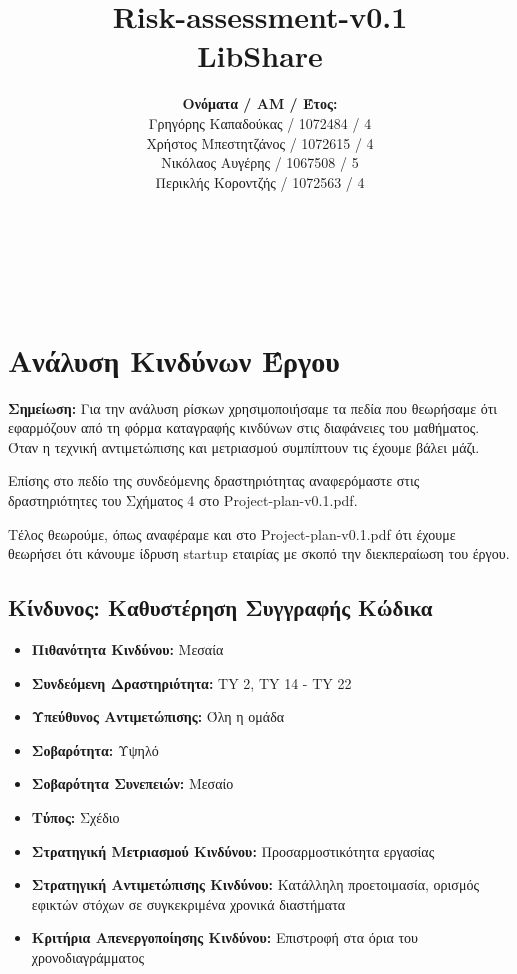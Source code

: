 \documentclass[12pt,a4paper]{article}
\title{Risk-assessment-v0.1\\ LibShare}
\author{\textbf{Ονόματα / ΑΜ / Έτος:} \\ Γρηγόρης Καπαδούκας / 1072484 / 4\textdegree \\ Χρήστος Μπεστητζάνος / 1072615 / 4\textdegree \\ Νικόλαος Αυγέρης / 1067508 / 5\textdegree \\ Περικλής Κοροντζής / 1072563 / 4\textdegree}
\begin{document}
\makeatletter
\begin{center}
	\LARGE{\@title} \\
	\pagebreak
\end{center}
\begin{LARGE}\@author\end{LARGE} \\
\pagebreak

\section{Ανάλυση Κινδύνων Έργου}

\textbf{Σημείωση:} Για την ανάλυση ρίσκων χρησιμοποιήσαμε τα πεδία που θεωρήσαμε ότι εφαρμόζουν από τη φόρμα καταγραφής κινδύνων στις διαφάνειες του μαθήματος. Όταν η τεχνική αντιμετώπισης και μετριασμού συμπίπτουν τις έχουμε βάλει μάζι.

Επίσης στο πεδίο της συνδεόμενης δραστηριότητας αναφερόμαστε στις δραστηριότητες του Σχήματος 4 στο Project-plan-v0.1.pdf.

Τέλος θεωρούμε, όπως αναφέραμε και στο Project-plan-v0.1.pdf ότι έχουμε θεωρήσει ότι κάνουμε ίδρυση startup εταιρίας με σκοπό την διεκπεραίωση του έργου.

\subsection{Κίνδυνος: Καθυστέρηση Συγγραφής Κώδικα}
\begin{itemize}
	\item \textbf{Πιθανότητα Κινδύνου:} Μεσαία
	\item \textbf{Συνδεόμενη Δραστηριότητα:} TY 2, TY 14 - TY 22
	\item \textbf{Υπεύθυνος Αντιμετώπισης:} Όλη η ομάδα
	\item \textbf{Σοβαρότητα:} Υψηλό
	\item \textbf{Σοβαρότητα Συνεπειών:} Μεσαίο
	\item \textbf{Τύπος:} Σχέδιο
	\item \textbf{Στρατηγική Μετριασμού Κινδύνου:} Προσαρμοστικότητα εργασίας
	\item \textbf{Στρατηγική Αντιμετώπισης Κινδύνου:} Κατάλληλη προετοιμασία, ορισμός εφικτών στόχων σε συγκεκριμένα χρονικά διαστήματα
	\item \textbf{Κριτήρια Απενεργοποίησης Κινδύνου:} Επιστροφή στα όρια του χρονοδιαγράμματος
\end{itemize}
\end{document}
